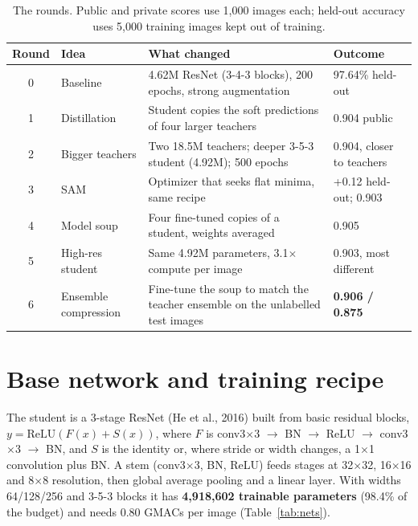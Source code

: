\documentclass[11pt]{article}
\begin{document}
\begin{table}[h]
\centering\small
\caption{The rounds. Public and private scores use 1,000 images each; held-out accuracy uses 5,000 training images kept out of training.}
\label{tab:rounds}
\begin{tabularx}{\linewidth}{@{}clXl@{}}
\toprule
Round & Idea & What changed & Outcome \\
\midrule
0 & Baseline & 4.62M ResNet (3-4-3 blocks), 200 epochs, strong augmentation & 97.64\% held-out \\
1 & Distillation & Student copies the soft predictions of four larger teachers & 0.904 public \\
2 & Bigger teachers & Two 18.5M teachers; deeper 3-5-3 student (4.92M); 500 epochs & 0.904, closer to teachers \\
3 & SAM & Optimizer that seeks flat minima, same recipe & +0.12 held-out; 0.903 \\
4 & Model soup & Four fine-tuned copies of a student, weights averaged & 0.905 \\
5 & High-res student & Same 4.92M parameters, 3.1$\times$ compute per image & 0.903, most different \\
6 & Ensemble compression & Fine-tune the soup to match the teacher ensemble on the unlabelled test images & \textbf{0.906 / 0.875} \\
\bottomrule
\end{tabularx}
\end{table}

\section{Base network and training recipe}
The student is a 3-stage ResNet (He et al., 2016) built from basic residual blocks, $y = \mathrm{ReLU}(F(x) + S(x))$, where $F$ is conv3$\times$3 $\to$ BN $\to$ ReLU $\to$ conv3$\times$3 $\to$ BN, and $S$ is the identity or, where stride or width changes, a 1$\times$1 convolution plus BN. A stem (conv3$\times$3, BN, ReLU) feeds stages at 32$\times$32, 16$\times$16 and 8$\times$8 resolution, then global average pooling and a linear layer. With widths 64/128/256 and 3-5-3 blocks it has \textbf{4,918,602 trainable parameters} (98.4\% of the budget) and needs 0.80 GMACs per image (Table~\ref{tab:nets}).
\end{document}
